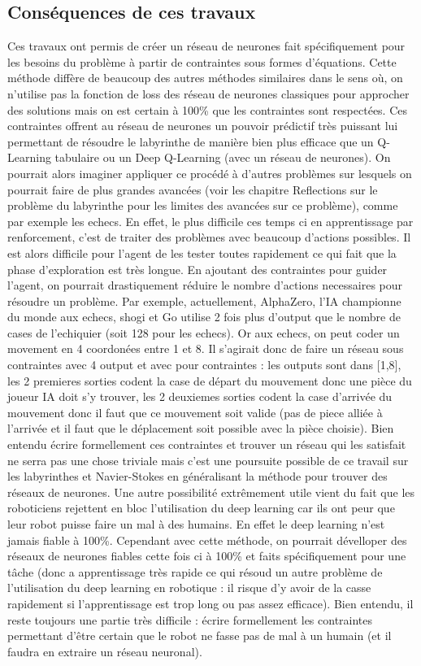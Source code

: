 \documentclass[12pt]{article}
\begin{document}
\subsection{Conséquences de ces travaux}
Ces travaux ont permis de créer un réseau de neurones fait spécifiquement pour les besoins du problème à partir de contraintes sous formes d'équations. Cette méthode diffère de beaucoup des autres méthodes similaires dans le sens où, on n'utilise pas la fonction de loss des réseau de neurones classiques pour approcher des solutions mais on est certain à 100\% que les contraintes sont respectées. Ces contraintes offrent au réseau de neurones un pouvoir prédictif très puissant lui permettant de résoudre le labyrinthe de manière bien plus efficace que un Q-Learning tabulaire ou un Deep Q-Learning (avec un réseau de neurones). On pourrait alors imaginer appliquer ce procédé à d'autres problèmes sur lesquels on pourrait faire de plus grandes avancées (voir les chapitre Reflections sur le problème du labyrinthe pour les limites des avancées sur ce problème), comme par exemple les echecs. En effet, le plus difficile ces temps ci en apprentissage par renforcement, c'est de traiter des problèmes avec beaucoup d'actions possibles. Il est alors difficile pour l'agent de les tester toutes rapidement ce qui fait que la phase d'exploration est très longue. En ajoutant des contraintes pour guider l'agent, on pourrait drastiquement réduire le nombre d'actions necessaires pour résoudre un problème. Par exemple, actuellement, AlphaZero, l'IA championne du monde aux echecs, shogi et Go utilise 2 fois plus d'output que le nombre de cases de l'echiquier (soit 128 pour les echecs). Or aux echecs, on peut coder un movement en 4 coordonées entre 1 et 8. Il s'agirait donc de faire un réseau sous contraintes avec 4 output et avec pour contraintes : les outputs sont dans [1,8], les 2 premieres sorties codent la case de départ du mouvement donc une pièce du joueur IA doit s'y trouver, les 2 deuxiemes sorties codent la case d'arrivée du mouvement donc il faut que ce mouvement soit valide (pas de piece alliée à l'arrivée et il faut que le déplacement soit possible avec la pièce choisie). Bien entendu écrire formellement ces contraintes et trouver un réseau qui les satisfait ne serra pas une chose triviale mais c'est une poursuite possible de ce travail sur les labyrinthes et Navier-Stokes en généralisant la méthode pour trouver des réseaux de neurones. Une autre possibilité extrêmement utile vient du fait que les roboticiens rejettent en bloc l'utilisation du deep learning car ils ont peur que leur robot puisse faire un mal à des humains. En effet le deep learning n'est jamais fiable à 100\%. Cependant avec cette méthode, on pourrait dévelloper des réseaux de neurones fiables cette fois ci à 100\% et faits spécifiquement pour une tâche (donc a apprentissage très rapide ce qui résoud un autre problème de l'utilisation du deep learning en robotique : il risque d'y avoir de la casse rapidement si l'apprentissage est trop long ou pas assez efficace). Bien entendu, il reste toujours une partie très difficile : écrire formellement les contraintes permettant d'être certain que le robot ne fasse pas de mal à un humain (et il faudra en extraire un réseau neuronal).
\end{document}
